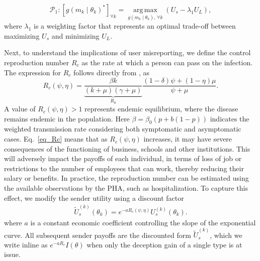 \documentclass[sigconf,review]{acmart}
\DeclareMathOperator*{\argmax}{arg\,max}
\begin{document}
\begin{equation}
\mathcal{P}_1:\left[g(m_k \mid \theta_k)^{\ast}\right]_{\forall k} = \argmax\limits_{g(m_k \mid \theta_k),\, \forall k} \left( U_s - \lambda_1 U_L \right),
\end{equation}
where $\lambda_1$ is a weighting factor that represents an optimal trade-off between maximizing $U_s$ and minimizing $U_L$.


Next, to  understand  the   implications of user    misreporting, we define the control reproduction number $R_c$ as the rate at which a person can pass on the infection. The expression for $R_c$ follows  directly from \cite{ChoiJTB2020}, as
\begin{equation}
    R_c(\psi,\eta) = \underbrace{\frac{\beta k}{(k+\mu)(\gamma + \mu)}}_{R_0}\frac{(1-\delta)\psi + (1-\eta)\mu}{\psi + \mu}.
\label{eq_Rc}
\end{equation} 
A value of $R_c(\psi,\eta)>1$ represents endemic equilibrium, where the disease remains endemic in the population. Here $\beta = \beta_0(p+b(1-p))$  indicates the weighted transmission rate considering both symptomatic and asymptomatic
cases. Eq.~\eqref{eq_Rc} means that as  $R_c(\psi,\eta)$ increases, it may have severe consequences of the functioning of business, schools and other institutions. This will adversely impact the payoffs of each individual, in terms of loss of job or restrictions to the number of employees that can work, thereby reducing their salary or benefits. In practice, the reproduction number can be estimated using the available observations  \cite{ShiArxiv2025} by the PHA, such as hospitalization. 
To capture this effect, we modify the sender utility using a discount factor
\begin{equation}
\begin{aligned}
\widetilde{U}_s^{(k)}(\theta_k)
=
e^{-aR_c(\psi,\eta)}
U_s^{(k)}(\theta_k).
\end{aligned}
\label{eq_sender_payoff_modified}
\end{equation}
where $a$ is a constant economic coefficient controlling the slope of the exponential curve. All subsequent sender payoffs are the discounted form $\widetilde{U}_s^{(k)}$, which we write inline as $e^{-aR_c}I(\theta)$ when only the deception gain of a single type is at issue.
\end{document}
